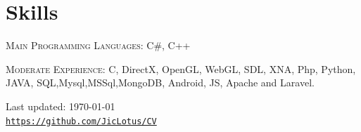 \documentclass[letterpaper]{article}
\def\footerlink{https://github.com/JicLotus/CV}
\newenvironment{no-indent-itemize}{
  \begin{list}{}{
    \setlength{\leftmargin}{0em}
  }
}{
  \end{list}
}
\begin{document}
\section*{Skills}
\begin{no-indent-itemize}
    
    \item\textsc{Main Programming Languages}: C\#, C++
    \item \textsc{Moderate Experience}: C, DirectX, OpenGL, WebGL, SDL, XNA, Php, Python, JAVA, SQL,Mysql,MSSql,MongoDB, Android, JS, Apache and Laravel.
    
\end{no-indent-itemize}


\bigskip
\begin{center}
  \begin{footnotesize}
    Last updated: \today \\
    \href{\footerlink}{\texttt{\footerlink}}
  \end{footnotesize}
\end{center}
\end{document}

